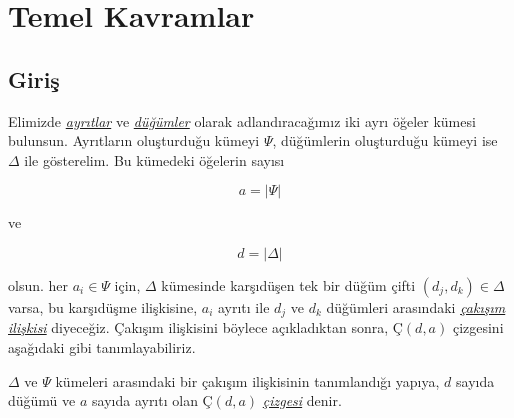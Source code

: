 \documentclass[fleqn]{book}
\begin{document}
\chapter{Temel Kavramlar}

\section{Giriş}

Elimizde \textit{\underline{ayrıtlar}} ve \textit{\underline{düğümler}} olarak adlandıracağımız iki ayrı öğeler kümesi bulunsun. 
Ayrıtların oluşturduğu kümeyi $\Psi$, düğümlerin oluşturduğu kümeyi ise $\Delta$ ile gösterelim. Bu kümedeki öğelerin sayısı

\begin{equation*}
	a = |\Psi|
\end{equation*}

ve

\begin{equation*}
	d = |\Delta|
\end{equation*}

olsun. her $a_{i} \in \Psi$ için, $\Delta$ kümesinde karşıdüşen tek bir düğüm çifti $(d_{j}, d_{k}) \in \Delta$ varsa, bu 
karşıdüşme ilişkisine, $a_{i}$ ayrıtı ile  $d_{j}$ ve $d_{k}$ düğümleri arasındaki \textit{\underline{çakışım ilişkisi}} diyeceğiz. 
Çakışım ilişkisini böylece açıkladıktan sonra, $Ç(d,a)$ çizgesini aşağıdaki gibi tanımlayabiliriz.

\begin{definition}
	$\Delta$ ve $\Psi$ kümeleri arasındaki bir çakışım ilişkisinin tanımlandığı yapıya, $d$ sayıda düğümü ve $a$ sayıda ayrıtı 
	olan $Ç(d,a)$ \textit{\underline{çizgesi}} denir.
\end{definition}
\end{document}
